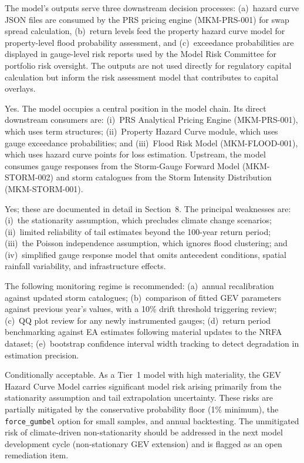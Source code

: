 \documentclass[11pt,a4paper]{article}
\begin{document}
The model's outputs serve three downstream decision processes: (a)~hazard curve JSON files are consumed by the PRS pricing engine (MKM-PRS-001) for swap spread calculation, (b)~return levels feed the property hazard curve model for property-level flood probability assessment, and (c)~exceedance probabilities are displayed in gauge-level risk reports used by the Model Risk Committee for portfolio risk oversight. The outputs are not used directly for regulatory capital calculation but inform the risk assessment model that contributes to capital overlays.

Yes. The model occupies a central position in the model chain. Its direct downstream consumers are: (i)~PRS Analytical Pricing Engine (MKM-PRS-001), which uses term structures; (ii)~Property Hazard Curve module, which uses gauge exceedance probabilities; and (iii)~Flood Risk Model (MKM-FLOOD-001), which uses hazard curve points for loss estimation. Upstream, the model consumes gauge responses from the Storm-Gauge Forward Model (MKM-STORM-002) and storm catalogues from the Storm Intensity Distribution (MKM-STORM-001).

Yes; these are documented in detail in Section~8. The principal weaknesses are: (i)~the stationarity assumption, which precludes climate change scenarios; (ii)~limited reliability of tail estimates beyond the 100-year return period; (iii)~the Poisson independence assumption, which ignores flood clustering; and (iv)~simplified gauge response model that omits antecedent conditions, spatial rainfall variability, and infrastructure effects.

The following monitoring regime is recommended: (a)~annual recalibration against updated storm catalogues; (b)~comparison of fitted GEV parameters against previous year's values, with a 10\% drift threshold triggering review; (c)~QQ plot review for any newly instrumented gauges; (d)~return period benchmarking against EA estimates following material updates to the NRFA dataset; (e)~bootstrap confidence interval width tracking to detect degradation in estimation precision.

Conditionally acceptable. As a Tier~1 model with high materiality, the GEV Hazard Curve Model carries significant model risk arising primarily from the stationarity assumption and tail extrapolation uncertainty. These risks are partially mitigated by the conservative probability floor (1\% minimum), the \texttt{force\_gumbel} option for small samples, and annual backtesting. The unmitigated risk of climate-driven non-stationarity should be addressed in the next model development cycle (non-stationary GEV extension) and is flagged as an open remediation item.
\end{document}
